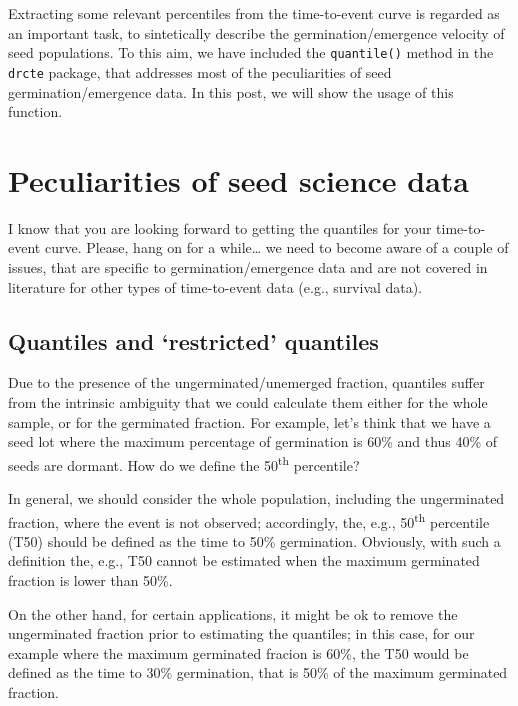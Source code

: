 \documentclass[
]{book}
\begin{document}
Extracting some relevant percentiles from the time-to-event curve is regarded as an important task, to sintetically describe the germination/emergence velocity of seed populations. To this aim, we have included the \texttt{quantile()} method in the \texttt{drcte} package, that addresses most of the peculiarities of seed germination/emergence data. In this post, we will show the usage of this function.

\hypertarget{peculiarities-of-seed-science-data}{%
\section{Peculiarities of seed science data}\label{peculiarities-of-seed-science-data}}

I know that you are looking forward to getting the quantiles for your time-to-event curve. Please, hang on for a while\ldots{} we need to become aware of a couple of issues, that are specific to germination/emergence data and are not covered in literature for other types of time-to-event data (e.g., survival data).

\hypertarget{quantiles-and-restricted-quantiles}{%
\subsection{Quantiles and `restricted' quantiles}\label{quantiles-and-restricted-quantiles}}

Due to the presence of the ungerminated/unemerged fraction, quantiles suffer from the intrinsic ambiguity that we could calculate them either for the whole sample, or for the germinated fraction. For example, let's think that we have a seed lot where the maximum percentage of germination is 60\% and thus 40\% of seeds are dormant. How do we define the 50\textsuperscript{th} percentile?

In general, we should consider the whole population, including the ungerminated fraction, where the event is not observed; accordingly, the, e.g., 50\textsuperscript{th} percentile (T50) should be defined as the time to 50\% germination. Obviously, with such a definition the, e.g., T50 cannot be estimated when the maximum germinated fraction is lower than 50\%.

On the other hand, for certain applications, it might be ok to remove the ungerminated fraction prior to estimating the quantiles; in this case, for our example where the maximum germinated fracion is 60\%, the T50 would be defined as the time to 30\% germination, that is 50\% of the maximum germinated fraction.
\end{document}
